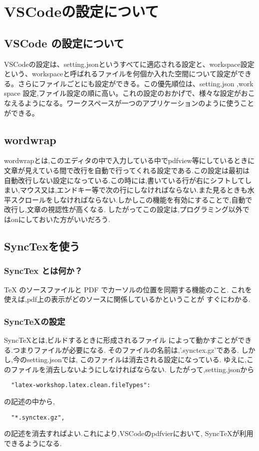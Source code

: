 \documentclass{ltjsarticle}
\begin{document}
\section{VSCodeの設定について}
\subsection{VSCode の設定について}
VSCodeの設定は、setting.jsonというすべてに適応される設定と、workspace設定という、workspaceと呼ばれるファイルを何個か入れた空間について設定ができる。さらにファイルごとにも設定ができる。この優先順位は、setting.json ,work space 設定,ファイル設定の順に高い。これの設定のおかげで、様々な設定がおこなえるようになる。ワークスペースが一つのアプリケーションのように使うことができる。
\subsection{wordwrap}
wordwrapとは,このエディタの中で入力している中でpdfview等にしているときに文章が見えている間で改行を自動で行ってくれる設定である.この設定は最初は自動改行しない設定になっている.この時には,書いている行が右にシフトしてしまい,マウス又は,エンドキー等で次の行にしなければならない.また見るときも水平スクロールをしなければならない.しかしこの機能を有効にすることで,自動で改行し,文章の視認性が高くなる.
したがってこの設定は,プログラミング以外ではonにしておいた方がいいだろう.
\subsection{SyncTexを使う}
\subsubsection*{SyncTex とは何か？}
TeX のソースファイルと PDF でカーソルの位置を同期する機能のこと.
これを使えば,pdf上の表示がどのソースに関係しているかということが
すぐにわかる.
\subsubsection*{SyncTeXの設定}
SyncTeXとは,ビルドするときに形成されるファイル
によって動かすことができる.つまりファイルが必要になる.
そのファイルの名前は,'.synctex.gz'である.
しかし,今のsetting.jsonでは,
このファイルは消去される設定になっている.
ゆえに,このファイルを消去しないようにしなければならない.
したがって,setting.jsonから
\begin{verbatim}
  "latex-workshop.latex.clean.fileTypes":
\end{verbatim}
の記述の中から,
\begin{verbatim}
  "*.synctex.gz",
\end{verbatim}
の記述を消去すればよい.これにより,VSCodeのpdfvierにおいて,
SyncTeXが利用できるようになる.
\end{document}
